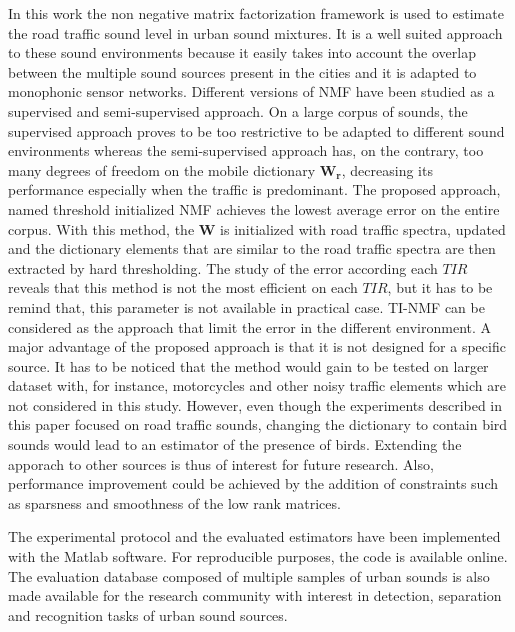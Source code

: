 \documentclass[twocolumn]{svjour3}          %
\begin{document}
In this work the non negative matrix factorization framework is used to estimate the road traffic sound level in urban sound mixtures. It is a well suited approach to these sound environments because it easily takes into account the overlap between the multiple sound sources present in the cities and it is adapted to monophonic sensor networks. Different versions of NMF have been studied as a supervised and semi-supervised approach. On a large corpus of sounds, the supervised approach proves to be too restrictive to be adapted to different sound environments whereas the semi-supervised approach has, on the contrary, too many degrees of freedom on the mobile dictionary $\mathbf{W_r}$, decreasing its performance especially when the traffic is predominant. The proposed approach, named threshold initialized NMF achieves the lowest average error on the entire corpus. With this method, the $\mathbf{W}$ is initialized with road traffic spectra, updated and the dictionary elements that are similar to the road traffic spectra are then extracted by hard thresholding.
The study of the error according each $TIR$ reveals that this method is not the most efficient on each $TIR$, but it has to be remind that, this parameter is not available in practical case. TI-NMF can be considered as the approach that limit the error in the different environment.
A major advantage of the proposed approach is that it is not designed for a specific source. It has to be noticed that the method would gain to be tested on larger dataset with, for instance, motorcycles and other noisy traffic elements which are not considered in this study. However, even though the experiments described in this paper focused on road traffic sounds, changing the dictionary to contain bird sounds would lead to an estimator of the presence of birds. Extending the apporach to other sources is thus of interest for future research. Also, performance improvement could be achieved by the addition of constraints such as sparsness \cite{hoyer2004non} and smoothness \cite{virtanen_monaural_2007} of the low rank matrices.

The experimental protocol and the evaluated estimators have been implemented with the Matlab software. For reproducible purposes, the code is available online. The evaluation database composed of multiple samples of urban sounds is also made available for the research community with interest in detection, separation and recognition tasks of urban sound sources.

\end{document}

